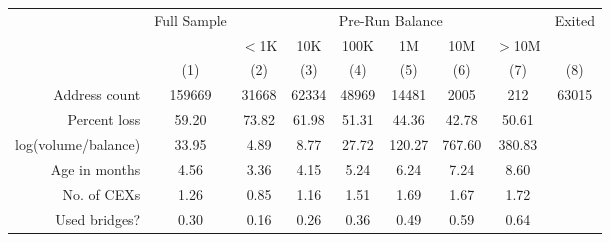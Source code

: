 \begin{center}
    \begin{tabular}{rcccccccc}
        \toprule
         & Full Sample & \multicolumn{6}{c}{Pre-Run Balance} & Exited \\
        \cline{3-8}
         &  & $<$1K & 10K & 100K & 1M & 10M & $>$10M &  \\
         & (1) & (2) & (3) & (4) & (5) & (6) & (7) & (8) \\
        \hline
        Address count        & 159669 & 31668 & 62334 & 48969 & 14481 & 2005 & 212 & 63015 \\
        Percent loss         & 59.20 & 73.82 & 61.98 & 51.31 & 44.36 & 42.78 & 50.61 &  \\
        log(volume/balance)  & 33.95 & 4.89 & 8.77 & 27.72 & 120.27 & 767.60 & 380.83 &  \\
        Age in months        & 4.56 & 3.36 & 4.15 & 5.24 & 6.24 & 7.24 & 8.60 &  \\
        No. of CEXs          & 1.26 & 0.85 & 1.16 & 1.51 & 1.69 & 1.67 & 1.72 &  \\
        Used bridges?        & 0.30 & 0.16 & 0.26 & 0.36 & 0.49 & 0.59 & 0.64 &  \\
        \bottomrule
    \end{tabular}
\end{center}
